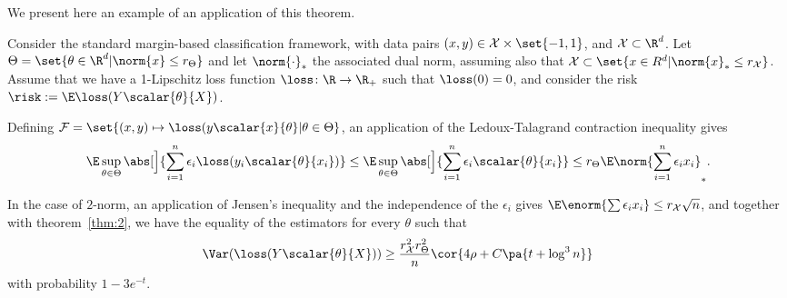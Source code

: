 We present here an example of an application of this theorem.
\begin{example}
    Consider the standard margin-based classification framework, with
    data pairs $(x,y) \in \mathcal{X} \times \set{-1, 1}$, and
    $\mathcal{X} \subset \R^d$. Let $\Theta = \set{\theta \in \R^d |
      \norm{x} \leq r_{\Theta}}$ and let $\norm{\cdot}_\ast$ the
    associated dual norm, assuming also that $\mathcal{X} \subset
    \set{x \in R^d | \norm{x}_\ast \leq r_{\mathcal{X}}}$. Assume that
    we have a 1-Lipschitz loss function $\loss \colon \R \to \R_+$
    such that $\loss(0) = 0$, and consider the risk $\risk := \E \loss(Y\scalar{\theta}{X})$.

    Defining $\mathcal{F} = \set{(x,y) \mapsto \loss(y \scalar{x}{\theta} | \theta \in \Theta}$, an application of the Ledoux-Talagrand contraction inequality gives
    \[
    \E \sup_{\theta \in \Theta} \abs[\Big]{\sum_{i=1}^n \epsilon_i\loss(y_i\scalar{\theta}{x_i})}
    \leq \E \sup_{\theta \in \Theta} \abs[\Big]{\sum_{i=1}^n \epsilon_i \scalar{\theta}{x_i}}
    \leq r_{\Theta} \E\norm{\sum_{i=1}^n \epsilon_i x_i}_\ast.
    \]

    In the case of $2$-norm, an application of Jensen's inequality and the independence of the $\epsilon_i$ gives $\E \enorm{\sum \epsilon_i x_i} \leq r_{\mathcal{X}} \sqrt{n}$, and together with theorem~\ref{thm:2}, we have the equality of the estimators for every $\theta$ such that
    \[
        \Var(\loss(Y\scalar{\theta}{X})) \geq \frac{r_{\mathcal{X}}^2 r_{\Theta}^2}{n}\cor{4\rho + C\pa{t + \log^3 n}}
    \]
    with probability $1-3e^{-t}$.
\end{example}


